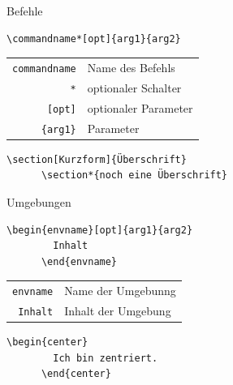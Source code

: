\begin{Frame}[fragile]{Befehle}
  \begin{Definition}[Befehl]
    \begin{lstlisting}[gobble=6,style=block,morekeywords={commandname,commandname*}]
      \commandname*[opt]{arg1}{arg2}
    \end{lstlisting}

    \begin{tabular}{rl}
      \lstinline[morekeywords={commandname}]-commandname- & Name des Befehls \\
      \lstinline-*- & optionaler Schalter \\
      \lstinline-[opt]- & optionaler Parameter \\
      \lstinline-{arg1}- & Parameter
    \end{tabular}
  \end{Definition}

  \xxx

  \begin{Beispiel}[Befehl]
    \begin{lstlisting}[gobble=6,style=block]
      \section[Kurzform]{Überschrift}
      \section*{noch eine Überschrift}
    \end{lstlisting}
  \end{Beispiel}
\end{Frame}

\begin{Frame}[fragile]{Umgebungen}
  \begin{Definition}[Umgebung]
    \begin{lstlisting}[gobble=6,style=block]
      \begin{envname}[opt]{arg1}{arg2}
        Inhalt
      \end{envname}
    \end{lstlisting}

    \begin{tabular}{rl}
      \lstinline-envname- & Name der Umgebunng \\
      \lstinline-Inhalt- & Inhalt der Umgebung
    \end{tabular}
  \end{Definition}

  \xxx

  \begin{Beispiel}[Umgebung]
    \begin{lstlisting}[gobble=6,style=block]
      \begin{center}
        Ich bin zentriert.
      \end{center}
    \end{lstlisting}
  \end{Beispiel}
\end{Frame}


